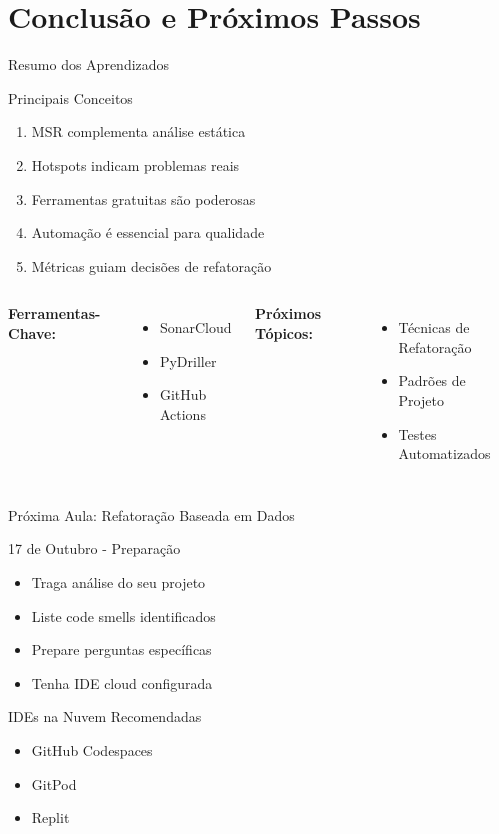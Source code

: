 \documentclass[aspectratio=169,11pt]{beamer}
\begin{document}
\section{Conclusão e Próximos Passos}

\begin{frame}{Resumo dos Aprendizados}
\begin{block}{Principais Conceitos}
\begin{enumerate}
    \item MSR complementa análise estática
    \item Hotspots indicam problemas reais
    \item Ferramentas gratuitas são poderosas
    \item Automação é essencial para qualidade
    \item Métricas guiam decisões de refatoração
\end{enumerate}
\end{block}

\begin{columns}[T]
\textbf{Ferramentas-Chave:}
\begin{itemize}
    \item SonarCloud
    \item PyDriller  
    \item GitHub Actions
\end{itemize}

\textbf{Próximos Tópicos:}
\begin{itemize}
    \item Técnicas de Refatoração
    \item Padrões de Projeto
    \item Testes Automatizados
\end{itemize}
\end{columns}
\end{frame}

\begin{frame}{Próxima Aula: Refatoração Baseada em Dados}
\begin{block}{17 de Outubro - Preparação}
\begin{itemize}
    \item Traga análise do seu projeto
    \item Liste code smells identificados
    \item Prepare perguntas específicas
    \item Tenha IDE cloud configurada
\end{itemize}
\end{block}

\begin{exampleblock}{ IDEs na Nuvem Recomendadas}
\begin{itemize}
    \item GitHub Codespaces
    \item GitPod
    \item Replit
\end{itemize}
\end{exampleblock}
\end{frame}
\end{document}
